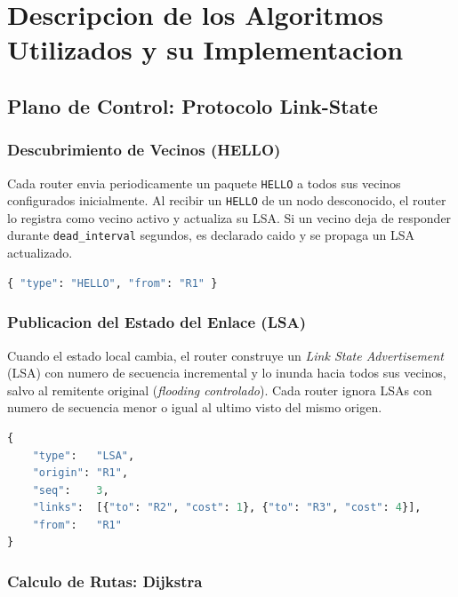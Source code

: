 ﻿\documentclass[12pt, a4paper]{article}
\begin{document}
\section{Descripcion de los Algoritmos Utilizados y su Implementacion}

\subsection{Plano de Control: Protocolo Link-State}

\subsubsection{Descubrimiento de Vecinos (HELLO)}

Cada router envia periodicamente un paquete \texttt{HELLO} a todos sus vecinos
configurados inicialmente. Al recibir un \texttt{HELLO} de un nodo
desconocido, el router lo registra como vecino activo y actualiza su LSA. Si
un vecino deja de responder durante \texttt{dead\_interval} segundos, es
declarado caido y se propaga un LSA actualizado.

\begin{lstlisting}[language=Python, caption=Estructura del paquete HELLO]
{ "type": "HELLO", "from": "R1" }
\end{lstlisting}

\subsubsection{Publicacion del Estado del Enlace (LSA)}

Cuando el estado local cambia, el router construye un \textit{Link State
Advertisement} (LSA) con numero de secuencia incremental y lo inunda hacia
todos sus vecinos, salvo al remitente original (\textit{flooding controlado}).
Cada router ignora LSAs con numero de secuencia menor o igual al ultimo visto
del mismo origen.

\begin{lstlisting}[language=Python, caption=Estructura del paquete LSA]
{
    "type":   "LSA",
    "origin": "R1",
    "seq":    3,
    "links":  [{"to": "R2", "cost": 1}, {"to": "R3", "cost": 4}],
    "from":   "R1"
}
\end{lstlisting}

\subsubsection{Calculo de Rutas: Dijkstra}
\end{document}
